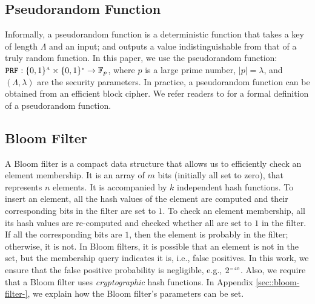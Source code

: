 


\subsection{Pseudorandom Function}


Informally, a pseudorandom function is a deterministic function that takes a key of length $\Lambda$ and an input; and outputs a value  indistinguishable from that of  a truly random function.  In this paper, we use the pseudorandom function:   $\mathtt {PRF}: \{0,1\}^{\scriptscriptstyle \Lambda}\times \{0,1\}^{\scriptscriptstyle *} \rightarrow  \mathbb{F}_p$, where $p$ is a large prime number, $|p|=\lambda$, and $(\Lambda,\lambda)$ are the security parameters. In practice, a pseudorandom function can be obtained from an efficient block cipher. We refer readers to \cite{DBLP:books/crc/KatzLindell2014} for a formal definition of a pseudorandom function.


\subsection{Bloom Filter}


A Bloom filter \cite{DBLP:journals/cacm/Bloom70} is a compact data structure that allows us to 
efficiently check an  element membership. It is an array of $m$ bits (initially all set to zero), that  represents $n$  elements. It is accompanied by $k$ independent hash functions. To insert an element, all the  hash values of the element are computed and their corresponding bits in the filter are set to $1$. To check an element membership, all its hash values are re-computed and checked whether all are set to $1$ in the filter. If all the corresponding bits are $1$, then the element is probably in the filter; otherwise, it is not. In Bloom filters,  it is possible that an element is not in the set, but the membership query indicates it is, i.e., false positives. In this work, we ensure that the false positive probability is negligible, e.g.,  $2^{\scriptscriptstyle - 40}$. Also, we require that a Bloom filter uses \emph{cryptographic} hash functions. In Appendix \ref{sec::bloom-filter-}, we explain how the Bloom filter's parameters can be set.




